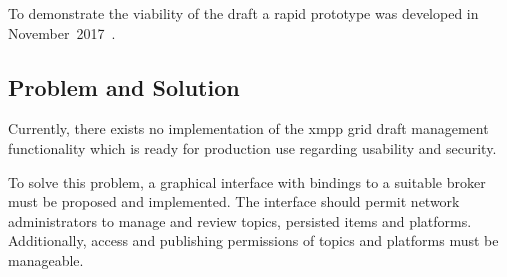 To demonstrate the viability of the draft a rapid prototype was developed in November~2017~\cite{xmpp-grid-prototype}.

\subsection{Problem and Solution}
Currently, there exists no implementation of the \gls{xmpp} grid draft management functionality which is ready for production use regarding usability and security.

To solve this problem, a graphical interface with bindings to a suitable \gls{broker} must be proposed and implemented.
The interface should permit network administrators to manage and review \glspl{topic}, persisted items and \glspl{platform}. Additionally, access and publishing permissions of \glspl{topic} and \glspl{platform} must be manageable.